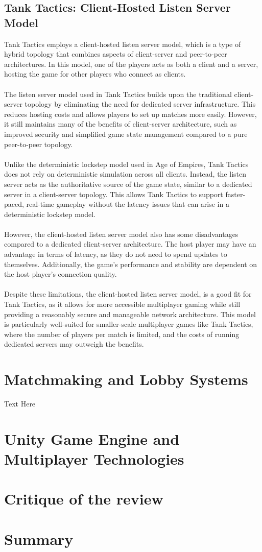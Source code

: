 \subsection{Tank Tactics: Client-Hosted Listen Server Model}
Tank Tactics employs a client-hosted listen server model, which is a type of hybrid topology that combines aspects of client-server and peer-to-peer architectures. In this model, one of the players acts as both a client and a server, hosting the game for other players who connect as clients.
\\
\noindent
\\
The listen server model used in Tank Tactics builds upon the traditional client-server topology by eliminating the need for dedicated server infrastructure. This reduces hosting costs and allows players to set up matches more easily. However, it still maintains many of the benefits of client-server architecture, such as improved security and simplified game state management compared to a pure peer-to-peer topology.
\\
\noindent
\\
Unlike the deterministic lockstep model used in Age of Empires, Tank Tactics does not rely on deterministic simulation across all clients. Instead, the listen server acts as the authoritative source of the game state, similar to a dedicated server in a client-server topology. This allows Tank Tactics to support faster-paced, real-time gameplay without the latency issues that can arise in a deterministic lockstep model.
\\
\noindent
\\
However, the client-hosted listen server model also has some disadvantages compared to a dedicated client-server architecture. The host player may have an advantage in terms of latency, as they do not need to spend updates to themselves. Additionally, the game's performance and stability are dependent on the host player's connection quality.
\\
\noindent
\\
Despite these limitations, the client-hosted listen server model, is a good fit for Tank Tactics, as it allows for more accessible multiplayer gaming while still providing a reasonably secure and manageable network architecture. This model is particularly well-suited for smaller-scale multiplayer games like Tank Tactics, where the number of players per match is limited, and the costs of running dedicated servers may outweigh the benefits.

\section{Matchmaking and Lobby Systems}

Text Here

\section{Unity Game Engine and Multiplayer Technologies}

\section{Critique of the review} %


\section{Summary} 

